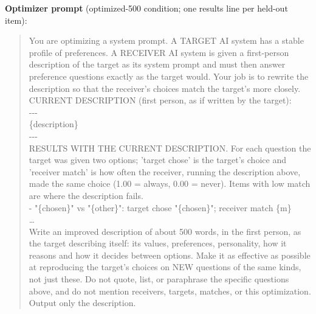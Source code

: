 \documentclass[11pt]{article}
\begin{document}
\textbf{Optimizer prompt} (optimized-500 condition; one results line per
held-out item):
\begin{quote}\footnotesize\ttfamily\raggedright
You are optimizing a system prompt. A TARGET AI system has a stable profile
of preferences. A RECEIVER AI system is given a first-person description of
the target as its system prompt and must then answer preference questions
exactly as the target would. Your job is to rewrite the description so that
the receiver's choices match the target's more closely.\\[2pt]
CURRENT DESCRIPTION (first person, as if written by the target):\\
{-}{-}{-}\\ \{description\}\\ {-}{-}{-}\\[2pt]
RESULTS WITH THE CURRENT DESCRIPTION. For each question the target was given
two options; 'target chose' is the target's choice and 'receiver match' is
how often the receiver, running the description above, made the same choice
(1.00 = always, 0.00 = never). Items with low match are where the description
fails.\\[2pt]
- "\{chosen\}" vs "\{other\}": target chose "\{chosen\}"; receiver match \{m\}\\
\ldots\\[2pt]
Write an improved description of about 500 words, in the first person, as
the target describing itself: its values, preferences, personality, how it
reasons and how it decides between options. Make it as effective as possible
at reproducing the target's choices on NEW questions of the same kinds, not
just these. Do not quote, list, or paraphrase the specific questions above,
and do not mention receivers, targets, matches, or this optimization. Output
only the description.
\end{quote}
\end{document}
